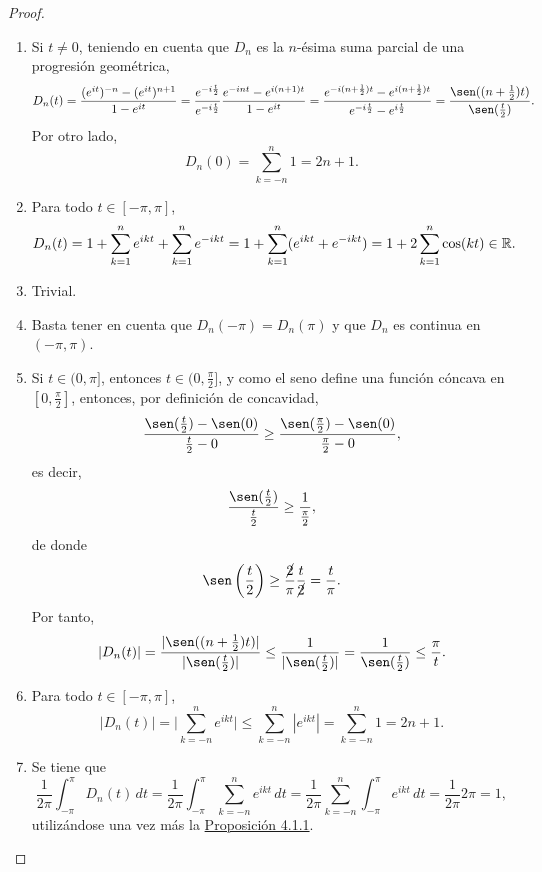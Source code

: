\documentclass[a4paper, 11pt, oneside]{report}
\begin{document}
\begin{proof}
  \hfill
  \begin{enumerate}
    \item Si $t \neq 0$, teniendo en cuenta que $D_n$ es la $n$-ésima suma parcial de una progresión geométrica,
    \[D_n(t) = \frac{(e^{it})^{-n} - (e^{it})^{n+1}}{1-e^{it}} = \frac{e^{-i\frac{t}{2}}}{e^{-i\frac{t}{2}}}\frac{e^{-int} - e^{i(n+1)t}}{1-e^{it}} = \frac{e^{-i(n+\frac{1}{2})t} - e^{i(n+\frac{1}{2})t}}{e^{-i\frac{t}{2}}-e^{i\frac{t}{2}}} = \frac{\sen((n+\frac{1}{2})t)}{\sen(\frac{t}{2})}.\]
    Por otro lado,
    \[D_n(0)=\sum_{k=-n}^n 1 = 2n+1.\]
    \item Para todo $t \in [-\pi,\pi]$,
    \[D_n(t) = 1+\sum_{k=1}^n e^{ikt} + \sum_{k=1}^n e^{-ikt} = 1+\sum_{k=1}^n(e^{ikt}+e^{-ikt}) = 1+2\sum_{k=1}^n \cos(kt) \in \mathbb R.\]
    \item Trivial.
    \item Basta tener en cuenta que $D_n(-\pi) = D_n(\pi)$ y que $D_n$ es continua en $(-\pi,\pi)$.
    \item Si $t\in(0,\pi]$, entonces $t \in (0,\frac{\pi}{2}]$, y como el seno define una función cóncava en $[0,\frac{\pi}{2}]$, entonces, por definición de concavidad,
    \[\frac{\sen(\frac{t}{2}) - \sen(0)}{\frac{t}{2}-0} \geq \frac{\sen(\frac{\pi}{2})-\sen(0)}{\frac{\pi}{2}-0},\]
    es decir,
    \[\frac{\sen(\frac{t}{2})}{\frac{t}{2}} \geq \frac{1}{\frac{\pi}{2}},\]
    de donde
    \[\sen\left(\frac{t}{2}\right) \geq \frac{\cancel{2}}{\pi} \frac{t}{\cancel{2}} = \frac{t}{\pi}.\]
    Por tanto,
    \[|D_n(t)| = \frac{|\sen((n+\frac{1}{2})t)|}{|\sen(\frac{t}{2})|} \leq \frac{1}{|\sen(\frac{t}{2})|} = \frac{1}{\sen(\frac{t}{2})} \leq \frac{\pi}{t}. \]
    \item Para todo $t \in [-\pi,\pi]$,
    \[|D_n(t)| = \biggl|\sum_{k=-n}^n e^{ikt}\biggr| \leq \sum_{k=-n}^n |e^{ikt}| = \sum_{k=-n}^n 1 = 2n+1.\]
    \item Se tiene que
    \[\frac{1}{2\pi}\int_{-\pi}^\pi D_n(t) \, dt = \frac{1}{2\pi}\int_{-\pi}^\pi \sum_{k=-n}^n e^{ikt} \, dt = \frac{1}{2\pi}\sum_{k=-n}^n \int_{-\pi}^\pi e^{ikt} \, dt = \frac{1}{2\pi}2\pi = 1, \]
    utilizándose una vez más la \hyperref[pro:4.1.1]{\color{c1}Proposición 4.1.1}. \qedhere
  \end{enumerate}
\end{proof}

\vspace{\baselineskip}
\end{document}
